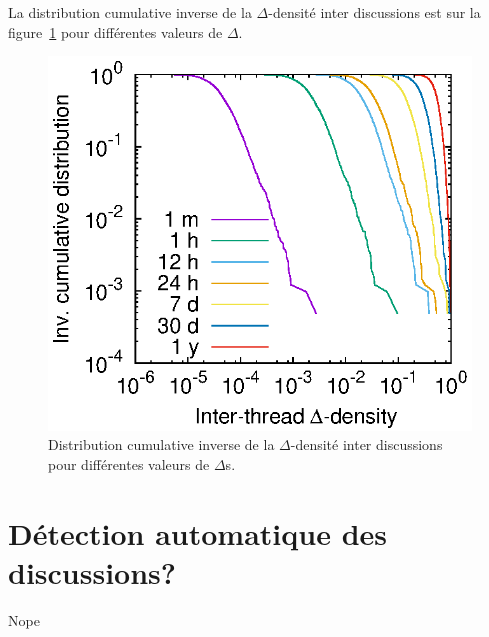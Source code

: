 La distribution cumulative inverse de la $\Delta$-densité inter discussions est sur la figure~\ref{fig:inter_dens_discussion} pour différentes valeurs de $\Delta$.
\begin{figure}
\centering
	\includegraphics[width=0.48\linewidth]{img/mailing/inter_delta.eps}
\caption{Distribution cumulative inverse de la $\Delta$-densité inter discussions pour différentes valeurs de $\Delta$s.}
\label{fig:inter_dens_discussion}
\end{figure}

\section{Détection automatique des discussions?}

Nope